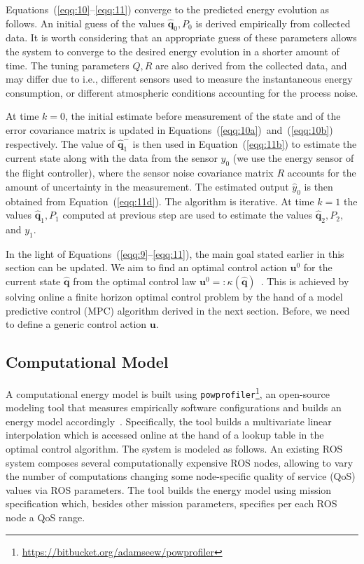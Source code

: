 \documentclass[letterpaper,10pt,conference]{ieeeconf}
\newcommand{\stt}[1]{{\small\tt #1}} %
\newcommand{\powprof}{\stt{powprofiler}}
\begin{document}
Equations~(\ref{eqq:10}--\ref{eqq:11}) converge to the predicted energy evolution as follows. An initial guess of the values $\hat{\mathbf{q}}_0,P_0$ is derived empirically from collected data. It is worth considering that an appropriate guess of these parameters allows the system to converge to the desired energy evolution in a shorter amount of time. The tuning parameters $Q,R$ are also derived from the collected data, and may differ due to i.e., different sensors used to measure the instantaneous energy consumption, or different atmospheric conditions accounting for the process noise.

At time $k=0$, the initial estimate before measurement of the state and of the error covariance matrix is updated in Equations~(\ref{eqq:10a})~and~(\ref{eqq:10b}) respectively. The value of $\hat{\mathbf{q}}_1^-$ is then used in Equation~(\ref{eqq:11b}) to estimate the current state along with the data from the sensor $y_0$ (we use the energy sensor of the flight controller), where the sensor noise covariance matrix $R$ accounts for the amount of uncertainty in the measurement. The estimated output $\hat{y}_0$ is then obtained from Equation~(\ref{eqq:11d}). The algorithm is iterative. At time $k=1$ the values $\hat{\mathbf{q}}_1,P_1$ computed at previous step are used to estimate the values $\hat{\mathbf{q}}_2,P_2,$ and $y_1$.

In the light of Equations~(\ref{eqq:9}--\ref{eqq:11}), the main goal stated earlier in this section can be updated. We aim to find an optimal control action $\mathbf{u}^0$ for the current state $\hat{\mathbf{q}}$ from the optimal control law $\mathbf{u}^0=:\kappa(\hat{\mathbf{q}})$~\cite{rawlings2017model}. This is achieved by solving online a finite horizon optimal control problem by the hand of a model predictive control (MPC) algorithm derived in the next section. Before, we need to define a generic control action $\mathbf{u}$.

\subsection{Computational Model}

A computational energy model is built using \powprof{}\footnote{\label{cross-ref:powprof-link}\url{https://bitbucket.org/adamseew/powprofiler}}, an open-source modeling tool that measures empirically software configurations and builds an energy model accordingly~\cite{seewald2019coarse}. Specifically, the tool builds a multivariate linear interpolation which is accessed online at the hand of a lookup table in the optimal control algorithm. The system is modeled as follows. An existing ROS system composes several computationally expensive ROS nodes, allowing to vary the number of computations changing some node-specific quality of service (QoS) values via ROS parameters. The tool builds the energy model using mission specification which, besides other mission parameters, specifies per each ROS node a QoS range.
\end{document}
